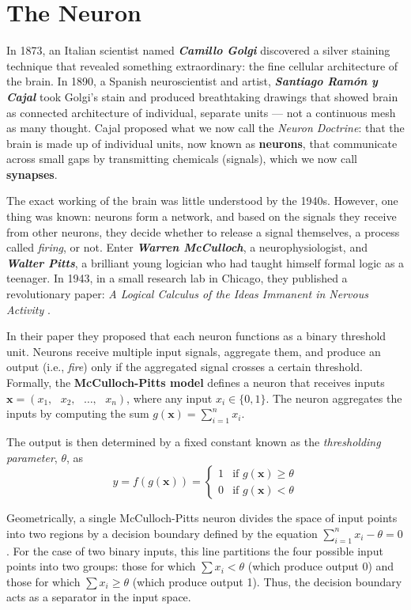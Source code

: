 \section{The Neuron}

In 1873, an Italian scientist named \textit{\textbf{Camillo Golgi}} discovered a silver staining technique that revealed something extraordinary: the fine cellular architecture of the brain. In 1890, a Spanish neuroscientist and artist, \textit{\textbf{Santiago Ramón y Cajal}} took Golgi's stain and produced breathtaking drawings that showed brain as connected architecture of individual, separate units --- not a continuous mesh as many thought. Cajal proposed what we now call the \textit{Neuron Doctrine}: that the brain is made up of individual units, now known as \textbf{neurons}, that communicate across small gaps by transmitting chemicals (signals), which we now call \textbf{synapses}. 

The exact working of the brain was little understood by the 1940s. However, one thing was known: neurons form a network, and based on the signals they receive from other neurons, they decide whether to release a signal themselves, a process called \textit{firing}, or not. Enter \textit{\textbf{Warren McCulloch}}, a neurophysiologist, and \textit{\textbf{Walter Pitts}}, a brilliant young logician who had taught himself formal logic as a teenager. In 1943, in a small research lab in Chicago, they published a revolutionary paper: \textit{A Logical Calculus of the Ideas Immanent in Nervous Activity} \cite{mcculloch_pitts}. 

In their paper they proposed that each neuron functions as a binary threshold unit. Neurons receive multiple input signals, aggregate them, and produce an output (i.e., \textit{fire}) only if the aggregated signal crosses a certain threshold. Formally, the \textbf{McCulloch-Pitts model} defines a neuron that receives inputs $\mathbf{x} = (x_1,\text{ }x_2,\text{ } \dots, \text{ }x_n)$, where any input $x_i \in \{0, 1\}$. The neuron aggregates the inputs by computing the sum $g(\mathbf{x}) = \sum_{i=1}^{n} x_i$. 

The output is then determined by a fixed constant known as the \textit{thresholding parameter}, $\theta$, as
$$
y = f(g(\mathbf{x})) = 
\begin{cases}
1 & \text{if } g(\mathbf{x}) \geq \theta \\
0 & \text{if } g(\mathbf{x}) < \theta
\end{cases}
$$

Geometrically, a single McCulloch-Pitts neuron divides the space of input points into two regions by a decision boundary defined by the equation $\sum_{i=1}^n x_i - \theta = 0$. For the case of two binary inputs, this line partitions the four possible input points into two groups: those for which $\sum x_i < \theta$ (which produce output 0) and those for which $\sum x_i \geq \theta$ (which produce output 1). Thus, the decision boundary acts as a separator in the input space.

